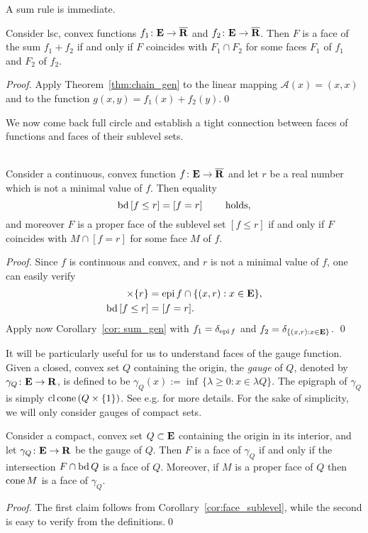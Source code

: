 \documentclass[smallextended,numbook]{svjour3}
\begin{document}
A sum rule is immediate.
\begin{cor}\label{cor: sum_gen}
Consider lsc, convex functions $f_1\colon{{\bf E}}\to\overline{{\bf R}}$ and $f_2\colon{{\bf E}}\to\overline{{\bf R}}$.
Then $F$ is a face of the sum $f_1+f_2$ if and only if $F$ coincides with $F_1\cap F_2$ for some faces $F_1$ of $f_1$ and $F_2$ of $f_2$.
\end{cor}
\begin{proof}
Apply Theorem~\ref{thm:chain_gen} to the linear mapping ${\mathcal{A}} (x)=(x,x)$ and to the function $g(x,y)=f_1(x)+f_2(y)$.\qed
\end{proof}

We now come back full circle and establish a tight connection between faces of functions and faces of their sublevel sets.
\begin{cor}\label{cor:face_sublevel}\hfill \\
Consider a continuous, convex function $f\colon{{\bf E}}\to\overline{{\bf R}}$ and let $r$ be a real number which is not a minimal value of $f$. Then equality
$${\mbox{\rm bd}\,} [f\leq r] = [f=r] \qquad\textrm{ holds},$$ and moreover
$F$ is a proper face of the sublevel set $[f\leq r]$ if and only if $F$ coincides with $M\cap [f=r]$ for some face $M$ of $f$.
\end{cor}
\begin{proof}
Since $f$ is continuous and convex, and $r$ is not a minimal value of $f$, one can easily verify 
\begin{align*}
[f\leq r]\times \{r\}&={\mbox{\rm epi}\,} f \cap \{(x,r): x\in{{\bf E}}\},\\
{\mbox{\rm bd}\,} [f\leq r] &= [f=r].
\end{align*}
Apply now Corollary~\ref{cor: sum_gen} with $f_1=\delta_{{\mbox{\rm {\scriptsize epi}}\,} f}$ and $f_2=\delta_{\{(x,r): x\in{{\bf E}}\}}$. \qed
\end{proof}

It will be particularly useful for us to understand faces of the gauge function. Given a closed, convex set $Q$ containing the origin, the {\em gauge} of $Q$, denoted by $\gamma_Q\colon{{\bf E}}\to{{\bf R}}$, is defined to be $\gamma_Q(x):=\inf\,\{\lambda\geq 0: x\in \lambda Q\}$. The epigraph of $\gamma_Q$ is simply ${\mbox{\rm cl}\,}{\mbox{\rm cone}\,} (Q\times \{1\})$. See e.g. \cite[Part I]{con_ter} for more details. For the sake of simplicity, we will only consider gauges of compact sets.

\begin{cor}\label{cor: face_g}
Consider a compact, convex set $Q\subset{{\bf E}}$ containing the origin in its interior, and let $\gamma_Q\colon{{\bf E}}\to{{\bf R}}$ be the gauge of $Q$. Then $F$ is a face of $\gamma_Q$ if and only if the intersection $F\cap{\mbox{\rm bd}\,} Q$ is a face of $Q$. Moreover, if $M$ is a proper face of $Q$ then ${\mbox{\rm cone}\,} M$ is a face of $\gamma_Q$.
\end{cor}
\begin{proof}
The first claim follows from Corollary~\ref{cor:face_sublevel}, while the second is easy to verify from the definitions.\qed
\end{proof}
\end{document}
